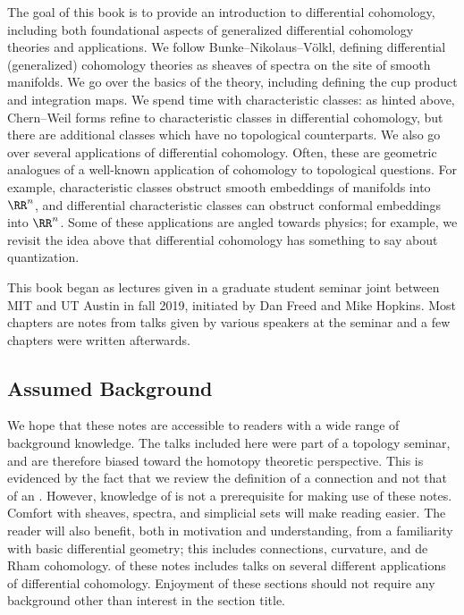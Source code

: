 The goal of this book is to provide an introduction to differential cohomology, including both foundational aspects
of generalized differential cohomology theories and applications. We follow Bunke--Nikolaus--Völkl, defining
differential (generalized) cohomology theories as sheaves of spectra on the site of smooth manifolds. We go over the
basics of the theory, including defining the cup product and integration maps. We spend time with characteristic
classes: as hinted above, Chern--Weil forms refine to characteristic classes in differential cohomology, but there
are additional classes which have no topological counterparts. We also go over several applications of differential
cohomology. Often, these are geometric analogues of a well-known application of cohomology to topological
questions. For example, characteristic classes obstruct smooth embeddings of manifolds into $\RR^n$, and
differential characteristic classes can obstruct conformal embeddings into $\RR^n$. Some of these applications are
angled towards physics; for example, we revisit the idea above that differential cohomology has something to say
about quantization.

This book began as lectures given in a graduate student seminar joint between MIT and UT Austin in fall 2019,
initiated by Dan Freed and Mike Hopkins. Most chapters are notes from talks given by various speakers at the
seminar and a few chapters were written afterwards.


\subsection{Assumed Background}

We hope that these notes are accessible to readers with a wide range of background knowledge.
The talks included here were part of a topology seminar,
and are therefore biased toward the homotopy theoretic perspective. 
This is evidenced by the fact that we review the definition of a connection
and not that of an \category.
However, knowledge of \categories is not a prerequisite for making use of these notes.
Comfort with sheaves, spectra, and simplicial sets will make reading easier.
The reader will also benefit, both in motivation and understanding,
from a familiarity with basic differential geometry;
this includes connections, curvature, and de Rham cohomology.
 of these notes includes talks on several different applications of differential cohomology.
Enjoyment of these sections should not require any background other than interest in the section title.



